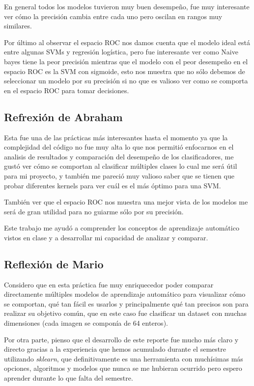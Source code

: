 \documentclass[sigconf,authorversion,nonacm]{acmart}
\begin{document}
En general todos los modelos tuvieron muy buen desempeño, fue muy interesante ver cómo la precisión cambia entre cada uno pero oscilan en rangos muy similares.

Por último al observar el espacio ROC nos damos cuenta que el modelo ideal está entre algunas SVMs y regresión logística, pero fue interesante ver como Naive bayes tiene la peor precisión mientras que el modelo con el peor desempeño en el espacio ROC es la SVM con sigmoide, esto nos muestra que no sólo debemos de seleccionar un modelo por su precisión si no que es valioso ver como se comporta en el espacio ROC para tomar decisiones.

\subsection{Refrexión de Abraham}
Esta fue una de las prácticas más interesantes hasta el momento ya que la complejidad del código no fue muy alta lo que nos permitió enfocarnos en el analisis de resultados y comparación del desempeño de los clasificadores, me gustó ver cómo se comportan al clasificar múltiples clases lo cual me será útil para mi proyecto, y también me pareció muy valioso saber que se tienen que probar diferentes kernels para ver cuál es el más óptimo para una SVM.

También ver que el espacio ROC nos muestra una mejor vista de los modelos me será de gran utilidad para no guiarme sólo por su precisión.

Este trabajo me ayudó a comprender los conceptos de aprendizaje automático vistos en clase y a desarrollar mi capacidad de analizar y comparar.


\subsection{Reflexión de Mario}
Considero que en esta práctica fue muy enriquecedor poder comparar directamente múltiples modelos de aprendizaje automático para visualizar cómo se comportan, qué tan fácil es usarlos y principalmente qué tan precisos son para realizar su objetivo común, que en este caso fue clasificar un dataset con muchas dimensiones (cada imagen se componía de 64 enteros).

Por otra parte, pienso que el desarrollo de este reporte fue mucho más claro y directo gracias a la experiencia que hemos acumulado durante el semestre utilizando \textit{sklearn}, que definitivamente es una herramienta con muchísimas más opciones, algoritmos y modelos que nunca se me hubieran ocurrido pero espero aprender durante lo que falta del semestre.
\end{document}
